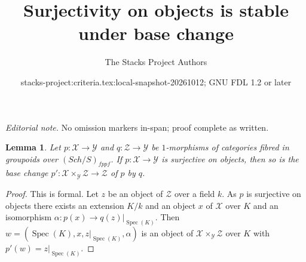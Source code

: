 \documentclass{stacks-project}
\title{Surjectivity on objects is stable under base change}
\author{The Stacks Project Authors}
\date{stacks-project:criteria.tex:local-snapshot-20261012; GNU FDL 1.2 or later}
\theoremstyle{plain}
\newtheorem{lemma}[subsection]{Lemma}
\theoremstyle{definition}
\theoremstyle{remark}
\numberwithin{equation}{subsection}
\def\Spec{\mathop{\mathrm{Spec}}}
\def\Sch{\mathit{Sch}}
\begin{document}
\maketitle
\noindent\textit{Editorial note.} No omission markers in-span; proof complete as written.\par\medskip
\begin{lemma}
\label{lemma-base-change-surjective}
Let $p : \mathcal{X} \to \mathcal{Y}$ and $q : \mathcal{Z} \to \mathcal{Y}$
be $1$-morphisms of categories fibred in groupoids over $(\Sch/S)_{fppf}$.
If $p : \mathcal{X} \to \mathcal{Y}$ is surjective on objects, then so
is the base change
$p' : \mathcal{X} \times_\mathcal{Y} \mathcal{Z} \to \mathcal{Z}$
of $p$ by $q$.
\end{lemma}

\begin{proof}
This is formal. Let $z$ be an object of $\mathcal{Z}$ over a field $k$.
As $p$ is surjective on objects there exists an extension $K/k$
and an object $x$ of $\mathcal{X}$ over $K$ and an isomorphism
$\alpha : p(x) \to q(z)|_{\Spec(K)}$. Then
$w = (\Spec(K), x, z|_{\Spec(K)}, \alpha)$ is an object of
$\mathcal{X} \times_\mathcal{Y} \mathcal{Z}$ over $K$ with
$p'(w) = z|_{\Spec(K)}$.
\end{proof}
\end{document}
